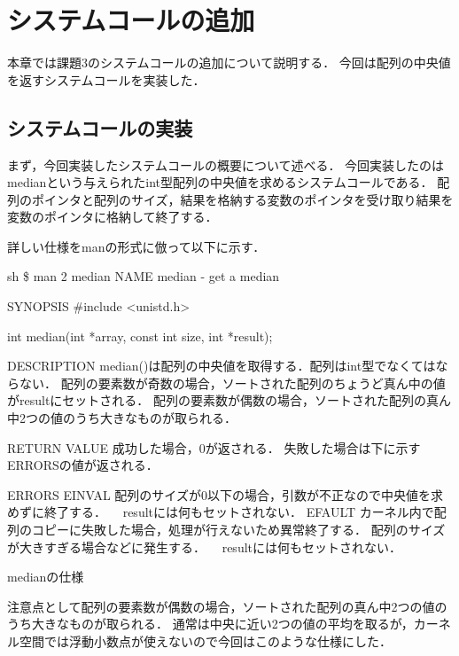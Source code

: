 \chapter{システムコールの追加}
本章では課題3のシステムコールの追加について説明する．
今回は配列の中央値を返すシステムコールを実装した．

\section{システムコールの実装}
まず，今回実装したシステムコールの概要について述べる．
今回実装したのはmedianという与えられたint型配列の中央値を求めるシステムコールである．
配列のポインタと配列のサイズ，結果を格納する変数のポインタを受け取り結果を変数のポインタに格納して終了する．

詳しい仕様をmanの形式に倣って以下に示す．
\begin{longlisting}
\begin{myminted}{sh}{}
\$ man 2 median
NAME
       median - get a median

SYNOPSIS
       #include <unistd.h>

       int median(int *array, const int size, int *result);

DESCRIPTION
       median()は配列の中央値を取得する．配列はint型でなくてはならない．
       配列の要素数が奇数の場合，ソートされた配列のちょうど真ん中の値がresultにセットされる．
       配列の要素数が偶数の場合，ソートされた配列の真ん中2つの値のうち大きなものが取られる．

RETURN VALUE
       成功した場合，0が返される．
       失敗した場合は下に示すERRORSの値が返される．

ERRORS
       EINVAL 配列のサイズが0以下の場合，引数が不正なので中央値を求めずに終了する．
            　resultには何もセットされない．
       EFAULT カーネル内で配列のコピーに失敗した場合，処理が行えないため異常終了する．
              配列のサイズが大きすぎる場合などに発生する．
            　resultには何もセットされない．
\end{myminted}
\caption{medianの仕様}
\label{lst:syscallspec}
\end{longlisting}

注意点として配列の要素数が偶数の場合，ソートされた配列の真ん中2つの値のうち大きなものが取られる．
通常は中央に近い2つの値の平均を取るが，カーネル空間では浮動小数点が使えないので今回はこのような仕様にした．

